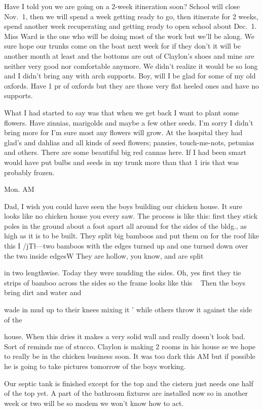 \documentclass[
]{book}
\begin{document}
Have I told you we are going on a 2-week itineration soon? School will close Nov.~1, then we will spend a week getting ready to go, then itinerate for 2 weeks, spend another week recuperating and getting ready to open school about Dec.~1. Miss Ward is the one who will be doing most of the work but we'll be along. We sure hope our trunks come on the boat next week for if they don't it will be another month at least and the bottoms are out of Claylon's shoes and mine are neither very good nor comfortable anymore. We didn't realize it would be so long and I didn't bring any with arch supports. Boy, will I be glad for some of my old oxfords. Have 1 pr of oxfords but they are those very flat heeled ones and have no supports.

What I had started to say was that when we get back I want to plant some flowers. Have zinnias, marigolds and maybe a few other seeds. I'm sorry I didn't bring more for I'm sure most any flowers will grow. At the hospital they had glad's and dahlias and all kinds of seed flowers; pansies, touch-me-nots, petunias and others. There are some beautiful big red cannas here. If I had been smart would have put bulbs and seeds in my trunk more than that 1 iris that was probably frozen.

Mon. AM

Dad, I wish you could have seen the boys building our chicken house. It sure looks like no chicken house you every saw. The process is like this: first they stick poles in the ground about a foot apart all around for the sides of the bldg., as high as it is to be built. They split big bamboos and put them on for the roof like this I /jT\l ---two bamboos with the edges turned up and one turned down over the two inside edgesW They are hollow, you know, and are split

in two lengthwise. Today they were mudding the sides. Oh, yes first they tie strips of bamboo across the sides so the frame looks like this ~ Then the boys bring dirt and water and

wade in mud up to their knees mixing it ' while others throw it against the side of the

house. When this dries it makes a very solid wall and really doesn't look bad. Sort of reminds me of stucco. Claylon is making 2 rooms in his house se we hope to really be in the chicken business soon. It was too dark this AM but if possible he is going to take pictures tomorrow of the boys working.

Our septic tank is finished except for the top and the cistern just needs one half of the top yet. A part of the bathroom fixtures are installed now so in another week or two will be so modem we won't know how to act.
\end{document}
